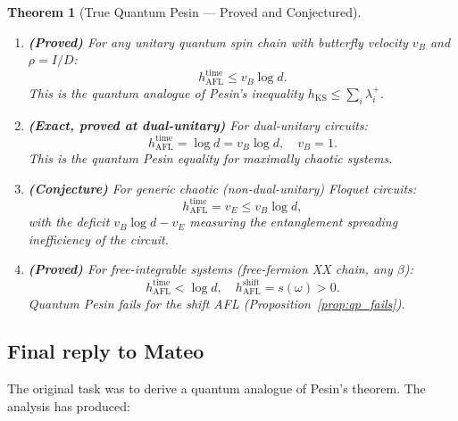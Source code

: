 \documentclass[12pt,a4paper]{article}
\newtheorem{theorem}{Theorem}[section]
\begin{document}
\begin{theorem}[True Quantum Pesin — Proved and Conjectured]
\label{thm:true_pesin}
\leavevmode
\begin{enumerate}
\item \textbf{(Proved)} For any unitary quantum spin chain with
butterfly velocity $v_B$ and $\rho=I/D$:
\[
  h_{\mathrm{AFL}}^{\mathrm{time}} \leq v_B\log d.
\]
This is the quantum analogue of Pesin's inequality
$h_{\mathrm{KS}}\leq\sum_i\lambda_i^+$.

\item \textbf{(Exact, proved at dual-unitary)} For dual-unitary circuits:
\[
  h_{\mathrm{AFL}}^{\mathrm{time}} = \log d = v_B\log d,\quad v_B=1.
\]
This is the quantum Pesin \emph{equality} for maximally chaotic systems.

\item \textbf{(Conjecture)} For generic chaotic (non-dual-unitary)
Floquet circuits:
\[
  h_{\mathrm{AFL}}^{\mathrm{time}} = v_E \leq v_B\log d,
\]
with the deficit $v_B\log d - v_E$ measuring the \emph{entanglement
spreading inefficiency} of the circuit.

\item \textbf{(Proved)} For free-integrable systems
(free-fermion XX chain, any $\beta$):
\[
  h_{\mathrm{AFL}}^{\mathrm{time}} < \log d,\quad
  h_{\mathrm{AFL}}^{\mathrm{shift}} = s(\omega)>0.
\]
Quantum Pesin fails for the shift AFL (Proposition~\ref{prop:qp_fails}).
\end{enumerate}
\end{theorem}

\subsection{Final reply to Mateo}

The original task was to derive a quantum analogue of Pesin's theorem.
The analysis has produced:
\end{document}

